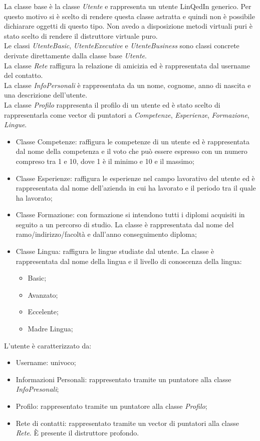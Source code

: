 \documentclass[11pt]{article}
\begin{document}
	La classe base è la classe \textit{Utente} e rappresenta un utente LinQedIn generico. Per questo motivo si è scelto di rendere questa classe astratta e quindi non è possibile dichiarare oggetti di questo tipo. Non avedo a disposizione metodi virtuali puri è stato scelto di rendere il distruttore virtuale puro.\\
	Le classi \textit{UtenteBasic}, \textit{UtenteExecutive} e \textit{UtenteBusiness} sono classi concrete derivate direttamente dalla classe base \textit{Utente}. \\
	La classe \textit{Rete} raffigura la relazione di amicizia ed è rappresentata dal username del contatto. \\
	La classe \textit{InfoPersonali} è rappresentata da un nome, cognome, anno di nascita e una descrizione dell'utente. \\
	La classe \textit{Profilo} rappresenta il profilo di un utente ed è stato scelto di rappresentarla come vector di puntatori a \textit{Competenze}, \textit{Esperienze}, \textit{Formazione}, \textit{Lingue}.
	\begin{itemize}
		\item Classe Competenze: raffigura le competenze di un utente ed è rappresentata dal nome della competenza e il voto che può essere espresso con un numero compreso tra 1 e 10, dove 1 è il minimo e 10 e il massimo;
		\item Classe Esperienze: raffigura le esperienze nel campo lavorativo del utente ed è rappresentata dal nome dell'azienda in cui ha lavorato e il periodo tra il quale ha lavorato;
		\item Classe Formazione: con formazione si intendono tutti i diplomi acquisiti in seguito a un percorso di studio. La classe è rappresentata dal nome del ramo/indirizzo/facoltà e dall'anno conseguimento diploma;
		\item Classe Lingua: raffigura le lingue studiate dal utente. La classe è rappresentata dal nome della lingua e il livello di conoscenza della lingua:
		\begin{itemize}
			\item Basic;
			\item Avanzato;
			\item Eccelente;
			\item Madre Lingua;
		\end{itemize}
	\end{itemize}
	L'utente è caratterizzato da:
	\begin{itemize}
		\item Username: univoco;
		\item Informazioni Personali: rappresentato tramite un puntatore alla classe \textit{InfoPresonali};
		\item Profilo: rappresentato tramite un puntatore alla classe \textit{Profilo};
		\item Rete di contatti: rappresentato tramite un vector di puntatori alla classe \textit{Rete}. È presente il distruttore profondo.
	\end{itemize}
\end{document}
